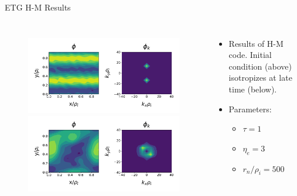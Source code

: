\documentclass[aspectratio=43]{beamer}
\begin{document}
   \begin{frame}{ETG H-M Results}
      \begin{columns}
            \begin{figure}
               \vspace*{-.5cm}
               \includegraphics[height=.43\textheight, width=\textwidth]{Images/hmPhiETG_init.pdf}
               \\
               \includegraphics[height=.43\textheight, width=\textwidth]{Images/hmPhiETG_iso.pdf}
            \end{figure}
            \begin{itemize}
               \vspace*{-1cm}
               \item Results of H-M code. Initial condition (above) isotropizes at late time (below).
               \item Parameters:
                  \begin{itemize}
                     \item $\tau=1$
                     \item $\eta_e=3$
                     \item $r_n/\rho_i=500$
                  \end{itemize}
            \end{itemize}
      \end{columns}
   \end{frame}
\end{document}
